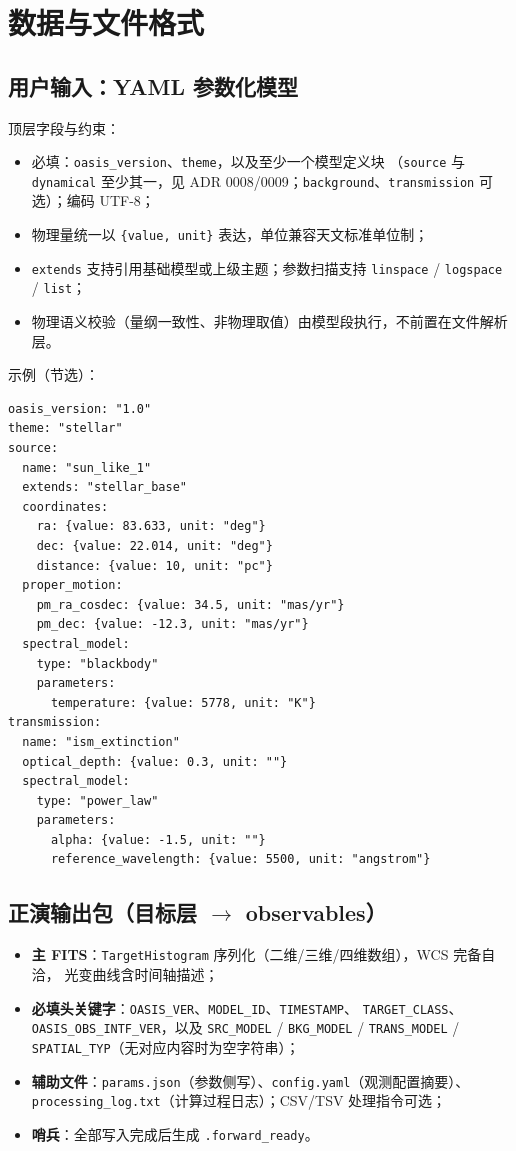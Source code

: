 \section{数据与文件格式}
\label{sec:formats}

\subsection{用户输入：YAML 参数化模型}

顶层字段与约束：
\begin{itemize}
  \item 必填：\texttt{oasis\_version}、\texttt{theme}，以及至少一个模型定义块
        （\texttt{source} 与 \texttt{dynamical} 至少其一，见 ADR 0008/0009；\texttt{background}、\texttt{transmission} 可选）；编码 UTF-8；
  \item 物理量统一以 \texttt{\{value, unit\}} 表达，单位兼容天文标准单位制；
  \item \texttt{extends} 支持引用基础模型或上级主题；参数扫描支持 \texttt{linspace} / \texttt{logspace} / \texttt{list}；
  \item 物理语义校验（量纲一致性、非物理取值）由模型段执行，不前置在文件解析层。
\end{itemize}

示例（节选）：
\begin{verbatim}
oasis_version: "1.0"
theme: "stellar"
source:
  name: "sun_like_1"
  extends: "stellar_base"
  coordinates:
    ra: {value: 83.633, unit: "deg"}
    dec: {value: 22.014, unit: "deg"}
    distance: {value: 10, unit: "pc"}
  proper_motion:
    pm_ra_cosdec: {value: 34.5, unit: "mas/yr"}
    pm_dec: {value: -12.3, unit: "mas/yr"}
  spectral_model:
    type: "blackbody"
    parameters:
      temperature: {value: 5778, unit: "K"}
transmission:
  name: "ism_extinction"
  optical_depth: {value: 0.3, unit: ""}
  spectral_model:
    type: "power_law"
    parameters:
      alpha: {value: -1.5, unit: ""}
      reference_wavelength: {value: 5500, unit: "angstrom"}
\end{verbatim}

\subsection{正演输出包（目标层 $\rightarrow$ observables）}

\begin{itemize}
  \item \textbf{主 FITS}：\texttt{TargetHistogram} 序列化（二维/三维/四维数组），WCS 完备自洽，
        光变曲线含时间轴描述；
  \item \textbf{必填头关键字}：\texttt{OASIS\_VER}、\texttt{MODEL\_ID}、\texttt{TIMESTAMP}、
        \texttt{TARGET\_CLASS}、\texttt{OASIS\_OBS\_INTF\_VER}，以及 \texttt{SRC\_MODEL} /
        \texttt{BKG\_MODEL} / \texttt{TRANS\_MODEL} / \texttt{SPATIAL\_TYP}（无对应内容时为空字符串）；
  \item \textbf{辅助文件}：\texttt{params.json}（参数侧写）、\texttt{config.yaml}（观测配置摘要）、
        \texttt{processing\_log.txt}（计算过程日志）；CSV/TSV 处理指令可选；
  \item \textbf{哨兵}：全部写入完成后生成 \texttt{.forward\_ready}。
\end{itemize}

